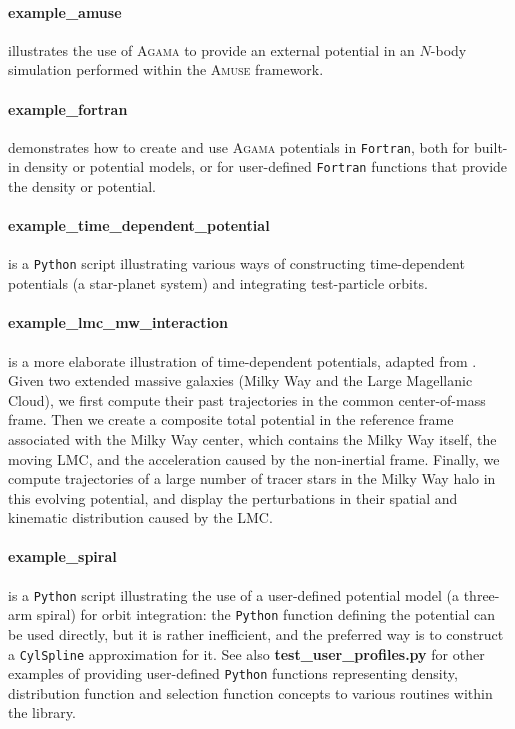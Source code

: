 \documentclass[12pt]{article}
\newcommand{\Agama}{\textsc{Agama}\xspace}
\newcommand{\Amuse}{\textsc{Amuse}\xspace}
\newcommand{\Python}{\texttt{Python}\xspace}
\newcommand{\Fortran}{\texttt{Fortran}\xspace}
\newcommand{\ppp}[1]{\textcolor{darkolive} {\texttt{#1}}}
\let\oldparagraph\paragraph
\renewcommand{\paragraph}[1]{\vspace{-2mm}\oldparagraph{#1}}
\begin{document}
\paragraph{example_amuse} illustrates the use of \Agama to provide an external potential in an $N$-body simulation performed within the \Amuse framework.

\paragraph{example_fortran} demonstrates how to create and use \Agama potentials in \Fortran, both for built-in density or potential models, or for user-defined \Fortran functions that provide the density or potential.

\paragraph{example_time_dependent_potential} is a \Python script illustrating various ways of constructing time-dependent potentials (a star-planet system) and integrating test-particle orbits.

\paragraph{example_lmc_mw_interaction} is a more elaborate illustration of time-dependent potentials, adapted from \cite{Vasiliev2021}. Given two extended massive galaxies (Milky Way and the Large Magellanic Cloud), we first compute their past trajectories in the common center-of-mass frame. Then we create a composite total potential in the reference frame associated with the Milky Way center, which contains the Milky Way itself, the moving LMC, and the acceleration caused by the non-inertial frame. Finally, we compute trajectories of a large number of tracer stars in the Milky Way halo in this evolving potential, and display the perturbations in their spatial and kinematic distribution caused by the LMC. 

\paragraph{example_spiral} \label{sec:ExampleSpiral} is a \Python script illustrating the use of a user-defined potential model (a three-arm spiral) for orbit integration: the \Python function defining the potential can be used directly, but it is rather inefficient, and the preferred way is to construct a \ppp{CylSpline} approximation for it. See also \textbf{test\_user\_profiles.py} for other examples of providing user-defined \Python functions representing density, distribution function and selection function concepts to various routines within the library.
\end{document}
